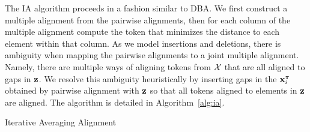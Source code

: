 \documentclass{article}
\begin{document}
The IA algorithm proceeds in a fashion similar to DBA.
We first construct a multiple alignment from the
pairwise alignments, then for each column of the multiple alignment
compute the token that minimizes the distance to each element within that column.
As we model insertions and deletions,
there is ambiguity when mapping the pairwise alignments to a joint multiple alignment.
Namely, there are multiple ways of aligning tokens from $\mathcal{X}$ that are all aligned to gaps
in $\bz$.
We resolve this ambiguity heuristically by inserting gaps in
the $\mathbf{x}_i^\pi$ obtained by pairwise alignment with $\bz$
so that all tokens aligned to elements in $\bz$ are aligned.
The algorithm is detailed in Algorithm~\ref{alg:ia}.

\begin{algorithm}[h]
\begin{algorithmic}

    \EndFor
\EndFor
{}
\EndFunction

\EndWhile
{}
\EndFunction

\Else
{}
\EndIf
\EndFor
\Return{$\bz$}
\EndFunction

\end{algorithmic}
\caption{\label{alg:ia}
Iterative Averaging Alignment
}
\end{algorithm}
\end{document}
